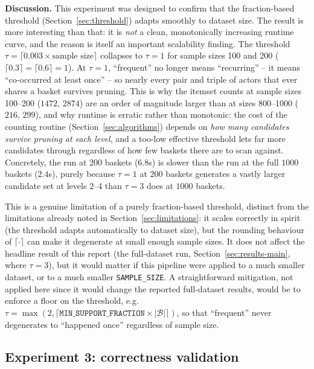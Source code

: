 \documentclass[11pt,a4paper]{article}
\begin{document}
\textbf{Discussion.} This experiment was designed to confirm that the
fraction-based threshold (Section~\ref{sec:threshold}) adapts smoothly to
dataset size. The result is more interesting than that: it is \emph{not} a
clean, monotonically increasing runtime curve, and the reason is itself an
important scalability finding. The threshold $\tau = \lceil 0.003 \times
\text{sample size} \rceil$ collapses to $\tau = 1$ for sample sizes 100 and
200 ($\lceil 0.3 \rceil = \lceil 0.6 \rceil = 1$). At $\tau = 1$, ``frequent''
no longer means ``recurring'' -- it means ``co-occurred at least once'' --
so nearly every pair and triple of actors that ever shares a basket survives
pruning. This is why the itemset counts at sample sizes 100--200 ($1472$,
$2874$) are an order of magnitude larger than at sizes 800--1000 ($216$,
$299$), and why runtime is erratic rather than monotonic: the cost of the
counting routine (Section~\ref{sec:algorithms}) depends on \emph{how many
candidates survive pruning at each level}, and a too-low effective threshold
lets far more candidates through regardless of how few baskets there are to
scan against. Concretely, the run at $200$ baskets ($6.8$s) is slower than the
run at the full $1000$ baskets ($2.4$s), purely because $\tau = 1$ at $200$
baskets generates a vastly larger candidate set at levels 2--4 than $\tau = 3$
does at $1000$ baskets.

This is a genuine limitation of a purely fraction-based threshold, distinct
from the limitations already noted in Section~\ref{sec:limitations}: it scales
correctly in spirit (the threshold adapts automatically to dataset size), but
the rounding behaviour of $\lceil \cdot \rceil$ can make it degenerate at
small enough sample sizes. It does not affect the headline result of this
report (the full-dataset run, Section~\ref{sec:results-main}, where
$\tau = 3$), but it would matter if this pipeline were applied to a much
smaller dataset, or to a much smaller \texttt{SAMPLE\_SIZE}. A straightforward
mitigation, not applied here since it would change the reported full-dataset
results, would be to enforce a floor on the threshold, e.g.\
$\tau = \max(2, \lceil \texttt{MIN\_SUPPORT\_FRACTION} \times |\mathcal{B}| \rceil)$,
so that ``frequent'' never degenerates to ``happened once'' regardless of
sample size.

\subsection{Experiment 3: correctness validation}
\end{document}
